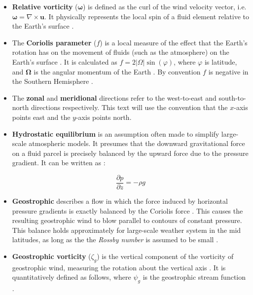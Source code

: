 \documentclass{article}
\begin{document}
\begin{itemize}
    \item \textbf{Relative vorticity} ($\bm{\omega}$) is defined as the curl of the wind velocity vector, i.e. $\bm{\omega} = \nabla \times \bm{u}$. It physically represents the local spin of a fluid element relative to the Earth's surface \cite{Vallis2017}. 

    \item The \textbf{Coriolis parameter} ($f$) is a local measure of the effect that the Earth's rotation has on the movement of fluids (such as the atmosphere) on the Earth's surface \cite{Vallis2017}. It is calculated as $f = 2 |\Omega| \sin (\varphi)$, where $\varphi$ is latitude, and $\bm\Omega$ is the angular momentum of the Earth \cite{sprenger2007userguide}. By convention $f$ is negative in the Southern Hemisphere \cite{Barnes2022main}.

    \item The \textbf{zonal} and \textbf{meridional} directions refer to the west-to-east and south-to-north directions respectively. This text will use the convention that the $x$-axis points east and the $y$-axis points north.

    \item \textbf{Hydrostatic equilibrium} is an assumption often made to simplify large-scale atmospheric models. It presumes that the downward gravitational force on a fluid parcel is precisely balanced by the upward force due to the pressure gradient. It can be written as \cite{Vallis2017}:

    \begin{equation}\label{hydrostatic_equilibrium}
        \frac{\partial p}{\partial z} = - \rho g
    \end{equation}

    \item
    \textbf{Geostrophic} describes a flow in which the force induced by horizontal pressure gradients is exactly balanced by the Coriolis force \cite{WMO1992}.
    This causes the resulting geostrophic wind to blow parallel to contours of constant pressure.
    This balance holds approximately for large-scale weather system in the mid latitudes, as long as the the \textit{Rossby number} is assumed to be small \cite{Vallis2017}.

    \item 
    \textbf{Geostrophic vorticity} ($\zeta_g$) is the vertical component of the vorticity of geostrophic wind, measuring the rotation about the vertical axis \cite{HOLTON_chapter6,WMO1992}.
    It is quantitatively defined as follows, where $\psi_g$ is the geostrophic stream function \cite{Vallis2017}.


\end{itemize}
\end{document}
